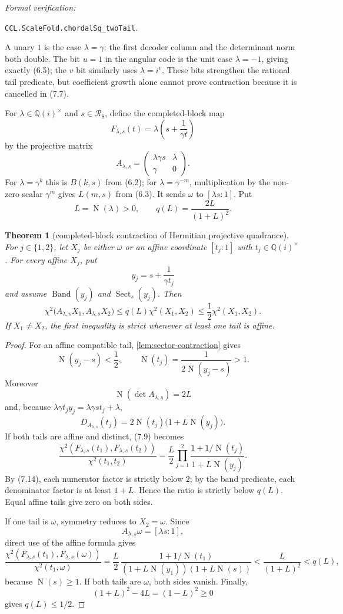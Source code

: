 \documentclass[10pt]{article}
\newtheorem{theorem}{Theorem}[section]
\theoremstyle{definition}
\theoremstyle{remark}
\newcommand{\Qi}{\mathbb{Q}(i)}
\newcommand{\Norm}{\operatorname{N}}
\newcommand{\leanref}[1]{\par\smallskip\noindent
  \emph{Formal verification:}\par\nobreak
  {\raggedright\nolinkurl{#1}.\par}}
\newcommand{\Proj}[2]{[#1:#2]}
\newcommand{\mat}[4]{\begin{pmatrix}#1&#2\\#3&#4\end{pmatrix}}
\begin{document}
\leanref{CCL.ScaleFold.chordalSq_twoTail}

A unary $1$ is the case $\lambda=\gamma$: the first decoder column and the determinant norm both double.  The bit $u=1$ in the angular code is the unit case $\lambda=-1$, giving exactly (6.5); the $v$ bit similarly uses $\lambda=i^v$.  These bits strengthen the rational tail predicate, but coefficient growth alone cannot prove contraction because it is cancelled in (7.7).

For $\lambda\in\Qi^\times$ and $s\in\mathcal R_8$, define the completed-block map
\[
 F_{\lambda,s}(t)=\lambda\left(s+\frac1{\gamma t}\right)
\]
by the projective matrix
\[
 A_{\lambda,s}
 =\mat{\lambda\gamma s}{\lambda}{\gamma}{0}.
\tag{7.11}
\]
For $\lambda=\gamma^k$ this is $B(k,s)$ from (6.2); for $\lambda=\gamma^{-m}$, multiplication by the non-zero scalar $\gamma^m$ gives $L(m,s)$ from (6.3).  It sends $\omega$ to $\Proj{\lambda s}{1}$.  Put
\[
 L=\Norm(\lambda)>0,
 \qquad
 q(L)=\frac{2L}{(1+L)^2}.
\tag{7.12}
\]

\begin{theorem}[completed-block contraction of Hermitian projective quadrance]\label{thm:block-projective-quadrance-contraction}
For $j\in\{1,2\}$, let $X_j$ be either $\omega$ or an affine coordinate $\Proj{t_j}{1}$ with $t_j\in\Qi^\times$.  For every affine $X_j$, put
\[
 y_j=s+\frac1{\gamma t_j}
\]
and assume $\operatorname{Band}(y_j)$ and $\operatorname{Sect}_s(y_j)$.  Then
\[
 \chi^2\bigl(A_{\lambda,s}X_1,A_{\lambda,s}X_2\bigr)
 \le q(L)\chi^2(X_1,X_2)
 \le\frac12\chi^2(X_1,X_2).
\tag{7.13}
\]
If $X_1\ne X_2$, the first inequality is strict whenever at least one tail is affine.
\end{theorem}

\begin{proof}
For an affine compatible tail, \autoref{lem:sector-contraction} gives
\[
 \Norm(y_j-s)<\frac12,
 \qquad
 \Norm(t_j)=\frac1{2\Norm(y_j-s)}>1.
\tag{7.14}
\]
Moreover
\[
 \Norm(\det A_{\lambda,s})=2L
\]
and, because $\lambda\gamma t_jy_j=\lambda\gamma s t_j+\lambda$,
\[
 D_{A_{\lambda,s}}(t_j)
 =2\Norm(t_j)\bigl(1+L\Norm(y_j)\bigr).
\tag{7.15}
\]
If both tails are affine and distinct, (7.9) becomes
\[
 \frac{\chi^2(F_{\lambda,s}(t_1),F_{\lambda,s}(t_2))}
 {\chi^2(t_1,t_2)}
 =\frac L2
 \prod_{j=1}^2
 \frac{1+1/\Norm(t_j)}{1+L\Norm(y_j)}.
\]
By (7.14), each numerator factor is strictly below $2$; by the band predicate, each denominator factor is at least $1+L$.  Hence the ratio is strictly below $q(L)$.  Equal affine tails give zero on both sides.

If one tail is $\omega$, symmetry reduces to $X_2=\omega$.  Since
\[
 A_{\lambda,s}\omega=\Proj{\lambda s}{1},
\]
direct use of the affine formula gives
\[
 \frac{\chi^2(F_{\lambda,s}(t_1),F_{\lambda,s}(\omega))}
 {\chi^2(t_1,\omega)}
 =\frac L2\,
 \frac{1+1/\Norm(t_1)}
 {(1+L\Norm(y_1))(1+L\Norm(s))}
 <\frac{L}{(1+L)^2}<q(L),
\]
because $\Norm(s)\ge1$.  If both tails are $\omega$, both sides vanish.  Finally,
\[
 (1+L)^2-4L=(1-L)^2\ge0
\]
gives $q(L)\le1/2$.
\end{proof}
\end{document}
